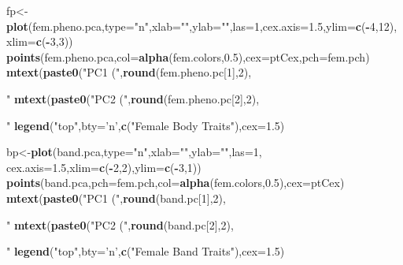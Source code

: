\documentclass[11pt,]{article}
\newenvironment{Shaded}{\begin{snugshade}}{\end{snugshade}}
\newcommand{\KeywordTok}[1]{\textcolor[rgb]{0.13,0.29,0.53}{\textbf{#1}}}
\newcommand{\DataTypeTok}[1]{\textcolor[rgb]{0.13,0.29,0.53}{#1}}
\newcommand{\DecValTok}[1]{\textcolor[rgb]{0.00,0.00,0.81}{#1}}
\newcommand{\FloatTok}[1]{\textcolor[rgb]{0.00,0.00,0.81}{#1}}
\newcommand{\StringTok}[1]{\textcolor[rgb]{0.31,0.60,0.02}{#1}}
\newcommand{\OperatorTok}[1]{\textcolor[rgb]{0.81,0.36,0.00}{\textbf{#1}}}
\newcommand{\NormalTok}[1]{#1}
\begin{document}
\begin{Shaded}
\begin{Highlighting}[]
{{\NormalTok{fp<-}\KeywordTok{plot}\NormalTok{(fem.pheno.pca,}\DataTypeTok{type=}\StringTok{"n"}\NormalTok{,}\DataTypeTok{xlab=}\StringTok{""}\NormalTok{,}\DataTypeTok{ylab=}\StringTok{""}\NormalTok{,}\DataTypeTok{las=}\DecValTok{1}\NormalTok{,}\DataTypeTok{cex.axis=}\FloatTok{1.5}\NormalTok{,}\DataTypeTok{ylim=}\KeywordTok{c}\NormalTok{(}\OperatorTok{-}\DecValTok{4}\NormalTok{,}\DecValTok{12}\NormalTok{),}
    \DataTypeTok{xlim=}\KeywordTok{c}\NormalTok{(}\OperatorTok{-}\DecValTok{3}\NormalTok{,}\DecValTok{3}\NormalTok{))}
\KeywordTok{points}\NormalTok{(fem.pheno.pca,}\DataTypeTok{col=}\KeywordTok{alpha}\NormalTok{(fem.colors,}\FloatTok{0.5}\NormalTok{),}\DataTypeTok{cex=}\NormalTok{ptCex,}\DataTypeTok{pch=}\NormalTok{fem.pch)}
\KeywordTok{mtext}\NormalTok{(}\KeywordTok{paste0}\NormalTok{(}\StringTok{"PC1 ("}\NormalTok{,}\KeywordTok{round}\NormalTok{(fem.pheno.pc[}\DecValTok{1}\NormalTok{],}\DecValTok{2}\NormalTok{),}\StringTok{"%)"}\NormalTok{),}\DecValTok{1}\NormalTok{,}\DataTypeTok{line=}\DecValTok{2}\NormalTok{)}
\KeywordTok{mtext}\NormalTok{(}\KeywordTok{paste0}\NormalTok{(}\StringTok{"PC2 ("}\NormalTok{,}\KeywordTok{round}\NormalTok{(fem.pheno.pc[}\DecValTok{2}\NormalTok{],}\DecValTok{2}\NormalTok{),}\StringTok{"%)"}\NormalTok{),}\DecValTok{2}\NormalTok{,}\DataTypeTok{line=}\FloatTok{2.5}\NormalTok{)}
\KeywordTok{legend}\NormalTok{(}\StringTok{"top"}\NormalTok{,}\DataTypeTok{bty=}\StringTok{'n'}\NormalTok{,}\KeywordTok{c}\NormalTok{(}\StringTok{"Female Body Traits"}\NormalTok{),}\DataTypeTok{cex=}\FloatTok{1.5}\NormalTok{)}

\NormalTok{bp<-}\KeywordTok{plot}\NormalTok{(band.pca,}\DataTypeTok{type=}\StringTok{"n"}\NormalTok{,}\DataTypeTok{xlab=}\StringTok{""}\NormalTok{,}\DataTypeTok{ylab=}\StringTok{""}\NormalTok{,}\DataTypeTok{las=}\DecValTok{1}\NormalTok{,}
         \DataTypeTok{cex.axis=}\FloatTok{1.5}\NormalTok{,}\DataTypeTok{xlim=}\KeywordTok{c}\NormalTok{(}\OperatorTok{-}\DecValTok{2}\NormalTok{,}\DecValTok{2}\NormalTok{),}\DataTypeTok{ylim=}\KeywordTok{c}\NormalTok{(}\OperatorTok{-}\DecValTok{3}\NormalTok{,}\DecValTok{1}\NormalTok{))}
\KeywordTok{points}\NormalTok{(band.pca,}\DataTypeTok{pch=}\NormalTok{fem.pch,}\DataTypeTok{col=}\KeywordTok{alpha}\NormalTok{(fem.colors,}\FloatTok{0.5}\NormalTok{),}\DataTypeTok{cex=}\NormalTok{ptCex)}
\KeywordTok{mtext}\NormalTok{(}\KeywordTok{paste0}\NormalTok{(}\StringTok{"PC1 ("}\NormalTok{,}\KeywordTok{round}\NormalTok{(band.pc[}\DecValTok{1}\NormalTok{],}\DecValTok{2}\NormalTok{),}\StringTok{"%)"}\NormalTok{),}\DecValTok{1}\NormalTok{,}\DataTypeTok{line=}\DecValTok{2}\NormalTok{)}
\KeywordTok{mtext}\NormalTok{(}\KeywordTok{paste0}\NormalTok{(}\StringTok{"PC2 ("}\NormalTok{,}\KeywordTok{round}\NormalTok{(band.pc[}\DecValTok{2}\NormalTok{],}\DecValTok{2}\NormalTok{),}\StringTok{"%)"}\NormalTok{),}\DecValTok{2}\NormalTok{,}\DataTypeTok{line=}\FloatTok{2.5}\NormalTok{)}
\KeywordTok{legend}\NormalTok{(}\StringTok{"top"}\NormalTok{,}\DataTypeTok{bty=}\StringTok{'n'}\NormalTok{,}\KeywordTok{c}\NormalTok{(}\StringTok{"Female Band Traits"}\NormalTok{),}\DataTypeTok{cex=}\FloatTok{1.5}\NormalTok{)}


}}}}}}
\end{Highlighting}
\end{Shaded}
\end{document}
